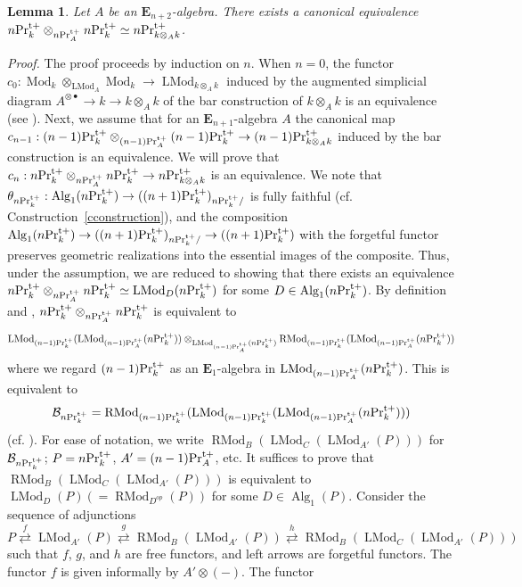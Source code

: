 \documentclass[leqno,12pt]{amsart}
\theoremstyle{plain}
\newtheorem{Lemma}[Theorem]{Lemma}
\theoremstyle{definition}
\newcommand{\PRTT}{\textup{Pr}^{\textup{t}+}}
\newcommand{\Mod}{\operatorname{Mod}}
\newcommand{\Alg}{\operatorname{Alg}}
\newcommand{\eone}{\mathbf{E}_1}
\newcommand{\LMod}{\operatorname{LMod}}
\newcommand{\RMod}{\operatorname{RMod}}
\newcommand{\Proof}{{\sl Proof.}\quad}
\begin{document}
\begin{Lemma}
\label{categorytensor}
Let $A$ be an $\mathbf{E}_{n+2}$-algebra.  There exists a canonical equivalence $n\PRTT_k\otimes_{n\PRTT_A}n\PRTT_k\simeq n\PRTT_{k\otimes_Ak}$.
\end{Lemma}




\Proof
The proof proceeds by induction on $n$.
When $n=0$, the functor
$c_0:\Mod_k\otimes_{\LMod_A}\Mod_k\to \LMod_{k\otimes_Ak}$ induced by the augmented simplicial diagram $A^{\otimes\bullet}\to k\to k\otimes_Ak$ of the bar construction of $k\otimes_Ak$
is an equivalence (see \cite[4.8.5.13]{HA}).
Next, we assume that  for an $\mathbf{E}_{n+1}$-algebra $A$ the canonical map $c_{n-1}:(n-1)\PRTT_k\otimes_{(n-1)\PRTT_A}(n-1)\PRTT_k\to (n-1)\PRTT_{k\otimes_Ak}$
induced by the bar construction is an equivalence.
We will prove that $c_n:n\PRTT_k\otimes_{n\PRTT_A}n\PRTT_k\to n\PRTT_{k\otimes_Ak}$ is an equivalence.
We note that $\theta_{n\PRTT_k}:\Alg_1(n\PRTT_k)\to ((n+1)\PRTT_k)_{n\PRTT_k/}$ is fully faithful (cf. Construction~\ref{cconstruction}),
and the composition $\Alg_1(n\PRTT_k)\to  ((n+1)\PRTT_k)_{n\PRTT_k/} \to ((n+1)\PRTT_k)$ with the forgetful functor
preserves geometric realizations into the essential images of the composite.
Thus, under the assumption, we are reduced to showing that there exists an equivalence $n\PRTT_k\otimes_{n\PRTT_A}n\PRTT_k\simeq \LMod_{D}(n\PRTT_k)$ for some $D\in \Alg_1(n\PRTT_k)$.
By definition and \cite[7.1.3.1]{HA}, $n\PRTT_k\otimes_{n\PRTT_A}n\PRTT_k$ is equivalent to 
\[
\LMod_{(n-1)\PRTT_k}(\LMod_{(n-1)\PRTT_A}(n\PRTT_k))\otimes_{\LMod_{(n-1)\PRTT_A}(n\PRTT_k)} \RMod_{(n-1)\PRTT_k}(\LMod_{(n-1)\PRTT_A}(n\PRTT_k))
\]
where we regard $(n-1)\PRTT_k$ as an $\eone$-algebra in $\LMod_{(n-1)\PRTT_A}(n\PRTT_k)$.
This is equivalent to 
\[
\mathcal{B}_{n\PRTT_k}=\RMod_{(n-1)\PRTT_k}(\LMod_{(n-1)\PRTT_k}(\LMod_{(n-1)\PRTT_A}(n\PRTT_k)))
\]
(cf. \cite[4.8.4.6]{HA}).
For ease of notation, we write $\RMod_{B}(\LMod_C(\LMod_{A'}(P)))$ for $\mathcal{B}_{n\PRTT_k}$;
$P=n\PRTT_k$, $A'=(n-1)\PRTT_A$, etc.
It suffices to prove that $\RMod_{B}(\LMod_C(\LMod_{A'}(P)))$ is equivalent to $\LMod_D(P)(=\RMod_{D^{op}}(P))$ for some $D\in \Alg_1(P)$.
Consider the sequence of adjunctions
\[
P\stackrel{f}{\rightleftarrows} \LMod_{A'}(P) \stackrel{g}{\rightleftarrows} \RMod_B(\LMod_{A'}(P))  \stackrel{h}{\rightleftarrows} \RMod_{B}(\LMod_C(\LMod_{A'}(P)))
\]
such that $f$, $g$, and $h$ are free functors, and left arrows are forgetful functors.
The functor $f$ is given informally by $A'\otimes (-)$. The functor 
\end{document}
